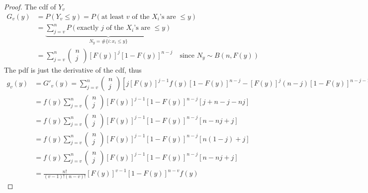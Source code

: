 \begin{proof}
    The cdf of $Y_v$
    \begin{align*}
        G_v(y) & = P(Y_v\leq y) = P(\text{at least }v\text{ of the }X_i\text{'s are }\leq y)\\
        & = \underbrace{\sum_{j=v}^{n}P(\text{exactly }j\text{ of the }X_i\text{'s are }\leq y)}_{N_y=\#\{i:x_i\leq y\}}\\
        & = \sum_{j=v}^{n}\left(\begin{array}{c}
        n\\j\end{array}\right)[F(y)]^j[1-F(y)]^{n-j}\quad \text{since }N_y\sim B(n,F(y))
    \end{align*}
    The pdf is just the derivative of the cdf, thus
    \begin{align*}
        g_v(y) & = G'_v(y) = \sum_{j=v}^{n}\left(\begin{array}{c}
        n\\j\end{array}\right)\left[j[F(y)]^{j-1}f(y)[1-F(y)]^{n-j} - [F(y)]^j(n-j)[1-F(y)]^{n-j-1}(-f(y))\right]\\
        & = f(y)\sum_{j=v}^{n}\left(\begin{array}{c}
        n\\j\end{array}\right)[F(y)]^{j-1}[1-F(y)]^{n-j}[j + n - j - nj]\\
        & = f(y)\sum_{j=v}^{n}\left(\begin{array}{c}
        n\\j\end{array}\right)[F(y)]^{j-1}[1-F(y)]^{n-j}[n - nj + j]\\
        & = f(y)\sum_{j=v}^{n}\left(\begin{array}{c}
        n\\j\end{array}\right)[F(y)]^{j-1}[1-F(y)]^{n-j}[n(1 - j) + j]\\
        & = f(y)\sum_{j=v}^{n}\left(\begin{array}{c}
        n\\j\end{array}\right)[F(y)]^{j-1}[1-F(y)]^{n-j}[n - nj + j]\\
        & = \frac{n!}{(v-1)!(n-v)!}[F(y)]^{v-1}[1-F(y)]^{n-v} f(y)
    \end{align*}
\end{proof}

